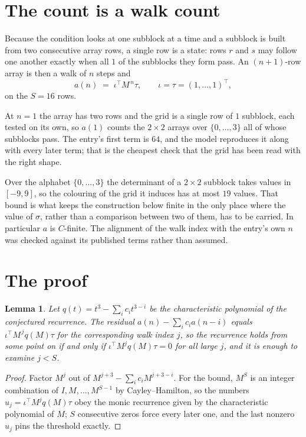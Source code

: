 \documentclass[11pt,a4paper]{article}
\theoremstyle{plain}
\newtheorem{lemma}[theorem]{Lemma}
\theoremstyle{definition}
\begin{document}
\section{The count is a walk count}

Because the condition looks at one subblock at a time and a subblock is
built from two consecutive array rows, a single row is a state: rows $r$ and $s$ may follow one
another exactly when all $1$ of the subblocks they form pass. An $(n+1)$-row array is then a
walk of $n$ steps and
\[
a(n)\;=\;\iota^{\!\top}M^{\,n}\tau,\qquad\iota=\tau=(1,\dots,1)^{\!\top},
\]
on the $S=16$ rows.

At $n=1$ the array has two rows and the grid is a single row of $1$
subblock, each tested on its own, so $a(1)$ counts the
$2\times2$ arrays over $\{0,\dots,3\}$ all of whose subblocks pass. The entry's
first term is $64$, and the model reproduces it along with every later term; that is the
cheapest check that the grid has been read with the right shape.

Over the alphabet $\{0,\dots,3\}$ the determinant of a $2\times2$ subblock takes values in
$[-9,9]$, so the colouring of the grid it induces has at most $19$ values.
That bound is what keeps the construction below finite in the only place where the value of
$\sigma$, rather than a comparison between two of them, has to be carried.
In particular $a$ is $C$-finite. The alignment of the walk index with the entry's own $n$ was
checked against its published terms rather than assumed.

\section{The proof}

\begin{lemma}\label{lem:crit}
Let $q(t)=t^{3}-\sum_i c_it^{3-i}$ be the characteristic polynomial of the
conjectured recurrence. The residual $a(n)-\sum_ic_ia(n-i)$ equals
$\iota^{\!\top}M^{\,j}q(M)\tau$ for the corresponding walk index $j$, so the recurrence
holds from some point on if and only if $\iota^{\!\top}M^{j}q(M)\tau=0$ for all large $j$,
and it is enough to examine $j<S$.
\end{lemma}

\begin{proof}
Factor $M^{j}$ out of $M^{j+3}-\sum_ic_iM^{j+3-i}$. For the bound, $M^{S}$
is an integer combination of $I,M,\dots,M^{S-1}$ by Cayley--Hamilton, so the numbers
$u_j=\iota^{\!\top}M^{j}q(M)\tau$ obey the monic recurrence given by the characteristic
polynomial of $M$; $S$ consecutive zeros force every later one, and the last nonzero $u_j$
pins the threshold exactly.
\end{proof}
\end{document}
